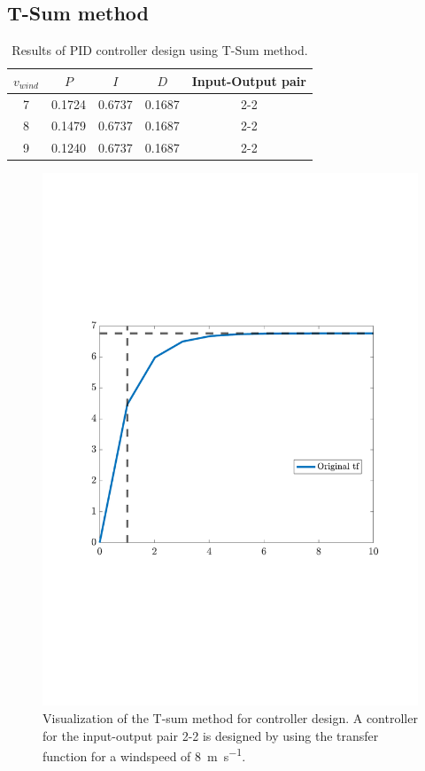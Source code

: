 \subsection{T-Sum method} \label{sec:condes:Tsum}


\begin{table}[H]
    \caption{Results of PID controller design using T-Sum method.}
    \centering
    \begin{tabular}{ccccc} \toprule
        $v_{wind}$ &$P$ & $I$ & $D$ & Input-Output pair \\ \midrule
        7 & 0.1724 & 0.6737 & 0.1687 & 2-2 \\
        8 & 0.1479 & 0.6737 & 0.1687 & 2-2 \\ 
        9 & 0.1240 & 0.6737 & 0.1687 & 2-2 \\ \bottomrule
    \end{tabular}
    \label{tab:condes:tsum:results}
\end{table}

\begin{figure}[H]
    \center
    \includegraphics[scale=0.7,trim=60 200 50 150,clip]{fig/G_22_T_sum_8ms.pdf}
    \caption{Visualization of the T-sum method for controller design. A controller for the input-output pair 2-2 is designed by using the transfer function for a windspeed of \SI{8}{\metre\per\second}.}
    \label{fig:condes:tsum:example}
\end{figure}

